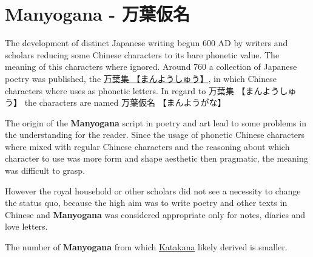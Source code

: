 \section{Manyogana - 万葉仮名} \label{sec:Manyogana}

The development of distinct Japanese writing begun 600 AD by writers and
scholars reducing some Chinese characters to its bare phonetic value. The
meaning of this characters where ignored. Around 760 a collection of Japanese
poetry was published, the \Link
\href{http://en.wikipedia.org/wiki/Man%27y%C5%8Dsh%C5%AB}{万葉集
【まんようしゅう】}, in which Chinese characters where uses as phonetic
letters. In regard to {万葉集} {【まんようしゅう】} the characters are named
{万葉仮名} {【まんようがな】}

The origin of the \textbf{Manyogana} script in poetry and art lead to some
problems in the understanding for the reader. Since the usage of phonetic
Chinese characters where mixed with regular Chinese characters and the
reasoning about which character to use was more form and shape aesthetic then
pragmatic, the meaning was difficult to grasp.

However the royal household or other scholars did not see a necessity to change
the status quo, because the high aim was to write poetry and other texts in
Chinese and \textbf{Manyogana} was considered appropriate only for notes,
diaries and love letters.


The number of \textbf{Manyogana} from which \hyperref[sec:Katakana]{Katakana}
likely derived is smaller.  


